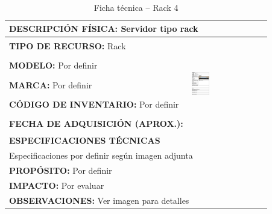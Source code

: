 \begin{table}[H]
\centering
\caption{Ficha técnica -- Rack 4}
\label{tab:rack-4}
\begin{tabular}{|p{}|p{}|}
\hline
\multicolumn{2}{|l|}{\textbf{DESCRIPCIÓN FÍSICA:} Servidor tipo rack} \\ \hline
\textbf{TIPO DE RECURSO:} Rack & 
\multirow{5}{*}{\includegraphics[width=0.25\textwidth,height=4cm,keepaspectratio]{tablas-images/cp1/racks/rack-4.png}} \\ \cline{1-1}
\textbf{MODELO:} Por definir & \\ \cline{1-1}
\textbf{MARCA:} Por definir & \\ \cline{1-1}
\textbf{CÓDIGO DE INVENTARIO:} Por definir & \\ \cline{1-1}
\textbf{FECHA DE ADQUISICIÓN (APROX.):} & \\ \hline
\multicolumn{2}{|l|}{\textbf{ESPECIFICACIONES TÉCNICAS}} \\ \hline
\multicolumn{2}{|p{0.95\textwidth}|}{
\footnotesize
Especificaciones por definir según imagen adjunta
} \\ \hline
\multicolumn{2}{|l|}{\textbf{PROPÓSITO:} Por definir} \\ \hline
\multicolumn{2}{|l|}{\textbf{IMPACTO:} Por evaluar} \\ \hline
\multicolumn{2}{|l|}{\textbf{OBSERVACIONES:} Ver imagen para detalles} \\ \hline
\end{tabular}
\end{table}

